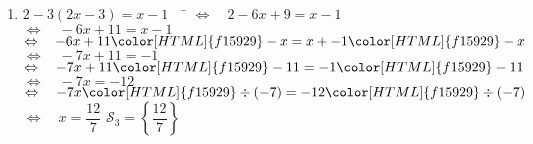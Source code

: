 \documentclass[a4paper,11pt,exos]{nsi} %
\begin{document}
\begin{enumerate}
    
    \item 	\begin{tabbing}
        $ 2-3(2x-3)=x-1 \quad$		\=	$\Leftrightarrow\quad 2-6x+9=x-1 $\\
        \>	$\Leftrightarrow\quad  -6x+11=x-1 $\\
        \>	$\Leftrightarrow\quad	-6x+11{\color[HTML]{f15929}-x}=x+-1{\color[HTML]{f15929}-x} $\\
        \>	$\Leftrightarrow\quad	-7x+11=-1 $\\
        \>	$\Leftrightarrow\quad	-7x+11{\color[HTML]{f15929}-11}=-1{\color[HTML]{f15929}-11} $\\
        \>	$\Leftrightarrow\quad	-7x=-12 $\\
        \>	$\Leftrightarrow\quad	-7x{\color[HTML]{f15929}\div(-7)}=-12{\color[HTML]{f15929}\div(-7)} $\\
        \>	$\Leftrightarrow\quad	x=\dfrac{12}{7} $ \hspace{4cm} $\mathcal{S}_3=\left\{ \dfrac{12}{7} \right\}$
    \end{tabbing}
\end{enumerate}
\end{document}
